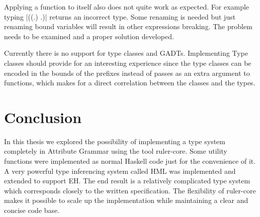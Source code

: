 Applying a function to itself also does not quite work as expected. For example typing |((.) .)| returns an incorrect type. Some renaming is needed but just renaming bound variables will result in other expressions breaking. The problem needs to be examined and a proper solution developed.
 
Currently there is no support for type classes and GADTs. Implementing Type classes should provide for an interesting experience since the type classes can be encoded in the bounds of the prefixes instead of passes as an extra argument to functions, which makes for a direct correlation between the classes and the types.
\section{Conclusion}
In this thesis we explored the possibility of implementing a type system completely in Attribute Grammar using the tool ruler-core. Some utility functions were implemented as normal Haskell code just for the convenience of it. A very powerful type inferencing system called HML was implemented and extended to support EH. The end result is a relatively complicated type system which corresponds closely to the written specification. The flexibility of ruler-core makes it possible to scale up the implementation while maintaining a clear and concise code base.

